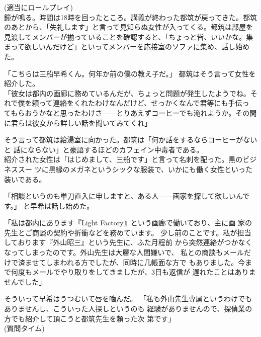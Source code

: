 \documentclass[a4paper,8pt,min]{jsarticle}
\begin{document}
(適当にロールプレイ)\\


鐘が鳴る。時間は18時を回ったところ。講義が終わった都筑が戻ってきた。都筑
のあとから、「失礼します」と言って見知らぬ女性が入ってくる。都筑は部屋を
見渡してメンバーが揃っていることを確認すると、「ちょっと皆、いいかな。集
まって欲しいんだけど」といってメンバーを応接室のソファに集め、話し始めた。

「こちらは三船早希くん。何年か前の僕の教え子だ。」
都筑はそう言って女性を紹介した。\\

「彼女は都内の画廊に務めているんだが、ちょっと問題が発生したようでね。そ
れで僕を頼って連絡をくれたわけなんだけど、せっかくなんで君等にも手伝っ
てもらおうかなと思ったわけさ------とりあえずコーヒーでも淹れようか。その間
に君らは彼女から詳しい話を聞いてみてくれ」


そう言って都筑は給湯室に向かった。都筑は「何か話をするならコーヒーがないと
話にならない」と豪語するほどのカフェイン中毒者である。\\


紹介された女性は「はじめまして、三船です」と言って名刺を配った。黒のビジネススー
ツに黒縁のメガネというシックな服装で、いかにも働く女性といった装いである。


「相談というのも単刀直入に申しますと、ある人------画家を探して欲しいんで
す。」
と早希は話し始めた。

「私は都内にあります『Light Factory』という画廊で働いており、主に画
家の先生とご商談の契約や折衝などを務めています。
少し前のことです。私が担当しております『外山昭三』という先生に、ふた月程前
から突然連絡がつかなくなってしまったのです。外山先生は大層な人間嫌いで、
私との商談もメールだけで済ませてしまわれる方でしたが、同時に几帳面な方で
もありました。今まで何度もメールでやり取りをしてきましたが、3日も返信が
遅れたことはありませんでした」

そういって早希はうつむいて唇を噛んだ。
「私も外山先生専属というわけでもありませんし、こういった人探しというのも
経験がありませんので、探偵業の方でも紹介して頂こうと都筑先生を頼った次
第です」\\

(質問タイム)
\end{document}
